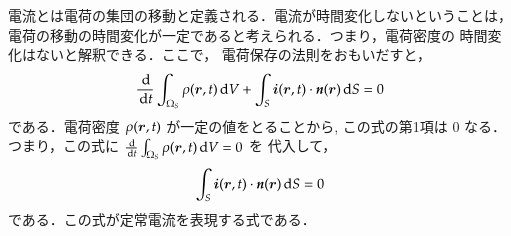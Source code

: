             電流とは電荷の集団の移動と定義される．電流が時間変化しないということは，
            電荷の移動の時間変化が一定であると考えられる．つまり，電荷密度の
            時間変化はないと解釈できる．ここで，
            電荷保存の法則をおもいだすと，
            \begin{align}
            \frac{\,\mathrm{d} }{\,\mathrm{d} t}\int_{\Omega_{S}} \rho(\boldsymbol{r},t)\,\mathrm{d} V
            +\int_{S} \boldsymbol{i}(\boldsymbol{r},t)\cdot\textit{\textbf{n}}(\boldsymbol{r})\,\mathrm{d} S=0
            \end{align}
            である．電荷密度 $\rho(\boldsymbol{r},t)$ が一定の値をとることから,
            この式の第1項は 0 なる．つまり，この式に
            $\frac{\,\mathrm{d} }{\,\mathrm{d} t}\int_{\Omega_{S}} \rho(\boldsymbol{r},t)\,\mathrm{d} V=0$ を
            代入して，
            \begin{align}
            \int_{S} \boldsymbol{i}(\boldsymbol{r},t)\cdot\textit{\textbf{n}}(\boldsymbol{r})\,\mathrm{d} S=0
            \end{align}
            である．この式が定常電流を表現する式である．

